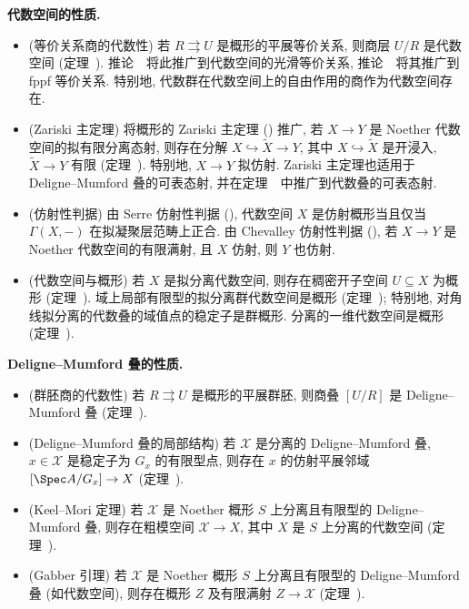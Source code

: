 \textbf{代数空间的性质.}
\begin{itemize}
\item (等价关系商的代数性) 若 $R\rightrightarrows U$ 是概形的平展等价关系, 则商层 $U/R$ 是代数空间 (定理~).
推论~~将此推广到代数空间的光滑等价关系, 推论~~将其推广到 fppf 等价关系.
特别地, 代数群在代数空间上的自由作用的商作为代数空间存在.
\item (Zariski 主定理) 将概形的 Zariski 主定理 () 推广, 若 $X\to Y$ 是 Noether 代数空间的拟有限分离态射, 则存在分解 $X\hookrightarrow\widetilde X\to Y$, 其中 $X\hookrightarrow\widetilde X$ 是开浸入, $\widetilde X\to Y$ 有限 (定理~).
特别地, $X\to Y$ 拟仿射. Zariski 主定理也适用于 Deligne--Mumford 叠的可表态射, 并在定理~~中推广到代数叠的可表态射.
\item (仿射性判据) 由 Serre 仿射性判据 (), 代数空间 $X$ 是仿射概形当且仅当 $\Gamma(X,-)$ 在拟凝聚层范畴上正合.
由 Chevalley 仿射性判据 (), 若 $X\to Y$ 是 Noether 代数空间的有限满射, 且 $X$ 仿射, 则 $Y$ 也仿射.
\item (代数空间与概形) 若 $X$ 是拟分离代数空间, 则存在稠密开子空间 $U\subseteq X$ 为概形 (定理~).
域上局部有限型的拟分离群代数空间是概形 (定理~); 特别地, 对角线拟分离的代数叠的域值点的稳定子是群概形.
分离的一维代数空间是概形 (定理~).
\end{itemize}

\textbf{Deligne--Mumford 叠的性质.}
\begin{itemize}
\item (群胚商的代数性) 若 $R\rightrightarrows U$ 是概形的平展群胚, 则商叠 $[U/R]$ 是 Deligne--Mumford 叠 (定理~).
\item (Deligne--Mumford 叠的局部结构) 若 $\mathcal X$ 是分离的 Deligne--Mumford 叠, $x\in\mathcal X$ 是稳定子为 $G_x$ 的有限型点, 则存在 $x$ 的仿射平展邻域 $[\Spec A/G_x]\to\mathcal X$ (定理~).
\item (Keel--Mori 定理) 若 $\mathcal X$ 是 Noether 概形 $S$ 上分离且有限型的 Deligne--Mumford 叠, 则存在粗模空间 $\mathcal X\to X$, 其中 $X$ 是 $S$ 上分离的代数空间 (定理~).
\item (Gabber 引理) 若 $\mathcal X$ 是 Noether 概形 $S$ 上分离且有限型的 Deligne--Mumford 叠 (如代数空间), 则存在概形 $Z$ 及有限满射 $Z\to\mathcal X$ (定理~).
\end{itemize}

